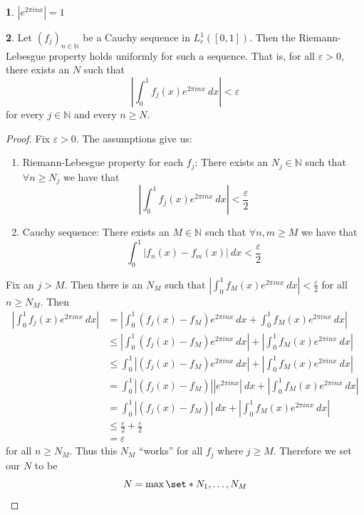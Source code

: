 \documentclass[11pt]{article}
\numberwithin{equation}{section}
\theoremstyle{definition}
\newtheorem{claim}{\color{ForestGreen}{\textbf{Claim}}}[section]
\theoremstyle{definition}
\newcommand\abs[1]{\left| #1 \right|}
\def\Set{\set*}%
\newcommand{\1}{\mathbbm 1}
\newcommand{\e}{\varepsilon}
\newcommand{\NN}{\mathbb N}
\begin{document}
\begin{claim}
	$\abs{e^{2\pi i n x}} = 1$
\end{claim}


\begin{claim}
	Let $(f_j)_{n \in \NN}$ be a Cauchy sequence in $L^1_c([0,1])$. Then the Riemann-Lebesgue property holds uniformly for such a sequence. That is, for all $\e > 0$, there exists an $N$ such that
	\begin{equation}
		\abs{\int_0^1 f_j(x)e^{2\pi i n x} \ dx} < \e
	\end{equation}
	for every $j \in \NN$ and every $n \geq N$. 
\end{claim}
\begin{proof}
	Fix $\e > 0$. The assumptions give us:
	\begin{enumerate}
		\item Riemann-Lebesgue property for each $f_j$: There exists an $N_j \in \NN$ such that $\forall n \geq N_j$ we have that
		\begin{equation}
			\abs{\int_0^1 f_j(x)e^{2\pi i n x} \ dx} < \frac{\e}{2}
		\end{equation}
		\item Cauchy sequence: There exists an $M \in \NN$ such that $\forall n,m \geq M$ we have that
		\begin{equation}
			\int_0^1 \abs{f_n(x) - f_m(x)} \ dx < \frac{\e}{2}
		\end{equation}
	\end{enumerate}

	Fix an $j > M$. Then there is an $N_M$ such that $\abs{\int_0^1 f_M(x)e^{2\pi i n x} \ dx} < \frac{\e}{2}$ for all $n \geq N_M$. Then
	\begin{align*}
		\abs{\int_0^1 f_j(x)e^{2\pi i n x} \ dx} &= \abs{\int_0^1 (f_j(x) - f_M)e^{2\pi i n x} \ dx + \int_0^1 f_M(x)e^{2\pi i n x} \ dx} \\
		&\leq \abs{\int_0^1 (f_j(x) - f_M)e^{2\pi i n x} \ dx} + \abs{\int_0^1 f_M(x)e^{2\pi i n x} \ dx} \\
		&\leq \int_0^1 \abs{(f_j(x) - f_M)e^{2\pi i n x} \ dx} + \abs{\int_0^1 f_M(x)e^{2\pi i n x} \ dx} \\
		&=  \int_0^1 \abs{(f_j(x) - f_M)}\abs{e^{2\pi i n x}} \ dx + \abs{\int_0^1 f_M(x)e^{2\pi i n x} \ dx} \\
		&= \int_0^1 \abs{(f_j(x) - f_M)} \ dx + \abs{\int_0^1 f_M(x)e^{2\pi i n x} \ dx} \\
		&\leq \frac{\e}{2} + \frac{\e}{2} \\
		&= \e
	\end{align*}
	for all $n \geq N_M$. Thus this $N_M$ ``works'' for all $f_j$ where $j \geq M$. Therefore we set our $N$ to be
	\begin{equation}
		N = \max\Set{N_1,\ldots,N_M}
	\end{equation}
	
\end{proof}
\end{document}
